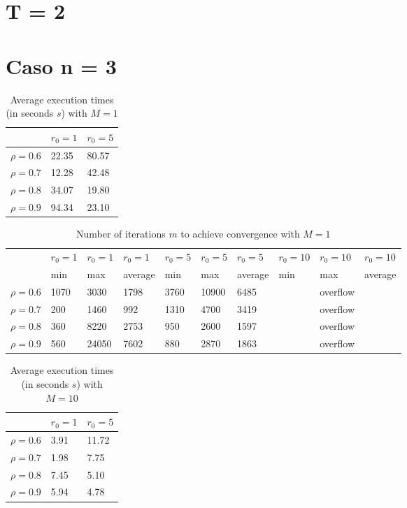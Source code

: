 \documentclass[a4paper,11pt,openright]{report}
\begin{document}
\section{T = 2}
\section*{Caso n = 3} 
\begin{table}[H]
\centering
\addtolength{\leftskip}{-1.5cm}
\addtolength{\rightskip}{-1.5cm}
\begin{tabular}{|c|ll|}
\hline
$ $ & $r_0 = 1$ & $r_0 = 5$ \\
\hline
$\rho = 0.6$ & 22.35 & 80.57 \\

$\rho = 0.7$ & 12.28 & 42.48 \\

$\rho = 0.8$ & 34.07 & 19.80 \\

$\rho = 0.9$ & 94.34 & 23.10 \\
\hline
\end{tabular}
\caption{Average execution
 times (in seconds $s$) with $M = 1$}
\end{table}
\begin{table}[H]
\centering
\addtolength{\leftskip}{-1.5cm}
\addtolength{\rightskip}{-1.5cm}
\begin{tabular}{|c|lllllllll|}
\hline
$ $ & $r_0 = 1$ & $r_0 = 1$ & $r_0 = 1$ & $r_0 = 5$ & $r_0 = 5$ & $r_0 = 5$ & $r_0 = 10$ & $r_0 = 10$ & $r_0 = 10$  \\
$ $ & min & max & average & min & max & average & min & max & average \\ 
\hline
$\rho = 0.6$ & 1070 & 3030 & 1798 & 3760 & 10900 & 6485 &  & overflow &  \\

$\rho = 0.7$ & 200 & 1460 & 992 & 1310 & 4700 & 3419 &  & overflow &  \\

$\rho = 0.8$ & 360 & 8220 & 2753 & 950 & 2600 & 1597 &  & overflow & \\

$\rho = 0.9$ & 560 & 24050 & 7602 & 880 & 2870 & 1863 &  & overflow & \\
\hline
\end{tabular}
\caption{Number of iterations $m$ to achieve convergence with $M = 1$}
\end{table}
\begin{table}[H]
\centering
\addtolength{\leftskip}{-1.5cm}
\addtolength{\rightskip}{-1.5cm}
\begin{tabular}{|c|ll|}
\hline
$ $ & $r_0 = 1$ & $r_0 = 5$ \\
\hline
$\rho = 0.6$ & 3.91 & 11.72 \\

$\rho = 0.7$ & 1.98 & 7.75 \\

$\rho = 0.8$ & 7.45 & 5.10 \\

$\rho = 0.9$ & 5.94 & 4.78 \\
\hline
\end{tabular}
\caption{Average execution
 times (in seconds $s$) with $M = 10$}
\end{table}
\end{document}
